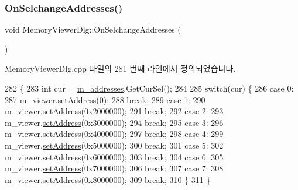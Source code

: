\subsubsection{\texorpdfstring{On\+Selchange\+Addresses()}{OnSelchangeAddresses()}}
{\footnotesize\ttfamily void Memory\+Viewer\+Dlg\+::\+On\+Selchange\+Addresses (\begin{DoxyParamCaption}{ }\end{DoxyParamCaption})\hspace{0.3cm}{\ttfamily [protected]}}



Memory\+Viewer\+Dlg.\+cpp 파일의 281 번째 라인에서 정의되었습니다.


\begin{DoxyCode}
282 \{
283   \textcolor{keywordtype}{int} cur = \mbox{\hyperlink{class_memory_viewer_dlg_ac61656d575927b23941090002e5ce996}{m\_addresses}}.GetCurSel();
284   
285   \textcolor{keywordflow}{switch}(cur) \{
286   \textcolor{keywordflow}{case} 0:
287     m\_viewer.\mbox{\hyperlink{class_memory_viewer_abe391051455e116889da0613c19888a2}{setAddress}}(0);
288     \textcolor{keywordflow}{break};
289   \textcolor{keywordflow}{case} 1:
290     m\_viewer.\mbox{\hyperlink{class_memory_viewer_abe391051455e116889da0613c19888a2}{setAddress}}(0x2000000);
291     \textcolor{keywordflow}{break};
292   \textcolor{keywordflow}{case} 2:
293     m\_viewer.\mbox{\hyperlink{class_memory_viewer_abe391051455e116889da0613c19888a2}{setAddress}}(0x3000000);
294     \textcolor{keywordflow}{break};
295   \textcolor{keywordflow}{case} 3:
296     m\_viewer.\mbox{\hyperlink{class_memory_viewer_abe391051455e116889da0613c19888a2}{setAddress}}(0x4000000);
297     \textcolor{keywordflow}{break};
298   \textcolor{keywordflow}{case} 4:
299     m\_viewer.\mbox{\hyperlink{class_memory_viewer_abe391051455e116889da0613c19888a2}{setAddress}}(0x5000000);
300     \textcolor{keywordflow}{break};
301   \textcolor{keywordflow}{case} 5:
302     m\_viewer.\mbox{\hyperlink{class_memory_viewer_abe391051455e116889da0613c19888a2}{setAddress}}(0x6000000);
303     \textcolor{keywordflow}{break};
304   \textcolor{keywordflow}{case} 6:
305     m\_viewer.\mbox{\hyperlink{class_memory_viewer_abe391051455e116889da0613c19888a2}{setAddress}}(0x7000000);
306     \textcolor{keywordflow}{break};
307   \textcolor{keywordflow}{case} 7:
308     m\_viewer.\mbox{\hyperlink{class_memory_viewer_abe391051455e116889da0613c19888a2}{setAddress}}(0x8000000);
309     \textcolor{keywordflow}{break};
310   \}
311 \}
\end{DoxyCode}
